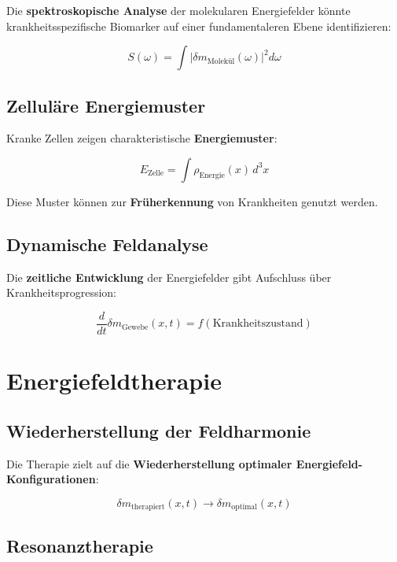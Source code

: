 \documentclass[12pt,a4paper]{report}
\begin{document}
	Die \textbf{spektroskopische Analyse} der molekularen Energiefelder könnte krankheitsspezifische Biomarker auf einer fundamentaleren Ebene identifizieren:
	
	\begin{equation}
		S(\omega) = \int |\delta m_{\text{Molekül}}(\omega)|^2 d\omega
	\end{equation}
	
	\subsection{Zelluläre Energiemuster}
	
	Kranke Zellen zeigen charakteristische \textbf{Energiemuster}:
	
	\begin{equation}
		E_{\text{Zelle}} = \int \rho_{\text{Energie}}(x) \, d^3x
	\end{equation}
	
	Diese Muster können zur \textbf{Früherkennung} von Krankheiten genutzt werden.
	
	\subsection{Dynamische Feldanalyse}
	
	Die \textbf{zeitliche Entwicklung} der Energiefelder gibt Aufschluss über Krankheitsprogression:
	
	\begin{equation}
		\frac{d}{dt}\delta m_{\text{Gewebe}}(x,t) = f(\text{Krankheitszustand})
	\end{equation}
	
	\section{Energiefeldtherapie}
	
	\subsection{Wiederherstellung der Feldharmonie}
	
	Die Therapie zielt auf die \textbf{Wiederherstellung optimaler Energiefeld-Konfigurationen}:
	
	\begin{equation}
		\delta m_{\text{therapiert}}(x,t) \to \delta m_{\text{optimal}}(x,t)
	\end{equation}
	
	\subsection{Resonanztherapie}
	
\end{document}
